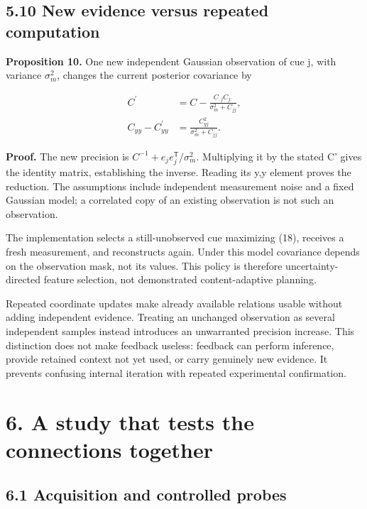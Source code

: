 \documentclass[
  american,
  11pt,
  letterpaper,
]{article}
\begin{document}
\subsection{5.10 New evidence versus repeated computation}\label{new-evidence-versus-repeated-computation}

\textbf{Proposition 10.} One new independent Gaussian observation of cue j, with variance \(\sigma_m^2\), changes the current posterior covariance by

\begin{equation}
\begin{aligned}C^{\prime}&=C-\frac{C_{:j}C_{j:}}{\sigma_m^2+C_{jj}},\\ C_{yy}-C^{\prime}_{yy}&=\frac{C_{yj}^2}{\sigma_m^2+C_{jj}}.\end{aligned}\tag{18}
\end{equation}

\textbf{Proof.} The new precision is \(C^{-1}+e_je_j^{\mathsf T}/\sigma_m^2\). Multiplying it by the stated C' gives the identity matrix, establishing the inverse. Reading its y,y element proves the reduction. The assumptions include independent measurement noise and a fixed Gaussian model; a correlated copy of an existing observation is not such an observation.

The implementation selects a still-unobserved cue maximizing (18), receives a fresh measurement, and reconstructs again. Under this model covariance depends on the observation mask, not its values. This policy is therefore uncertainty-directed feature selection, not demonstrated content-adaptive planning.

Repeated coordinate updates make already available relations usable without adding independent evidence. Treating an unchanged observation as several independent samples instead introduces an unwarranted precision increase. This distinction does not make feedback useless: feedback can perform inference, provide retained context not yet used, or carry genuinely new evidence. It prevents confusing internal iteration with repeated experimental confirmation.

\section{6. A study that tests the connections together}\label{a-study-that-tests-the-connections-together}

\subsection{6.1 Acquisition and controlled probes}\label{acquisition-and-controlled-probes}
\end{document}
